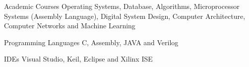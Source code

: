 \begin{cvskills}
	\cvskill
	{Academic Courses}
	{Operating Systems, Database, Algorithms, Microprocessor Systems (Assembly Language), Digital System Design, Computer Architecture, Computer Networks and Machine Learning}
	
	\cvskill
	{Programming Languages}
	{C, Assembly, JAVA and Verilog}
	
	\cvskill
	{IDEs}
	{Visual Studio, Keil, Eclipse and Xilinx ISE}
	
%
\end{cvskills}